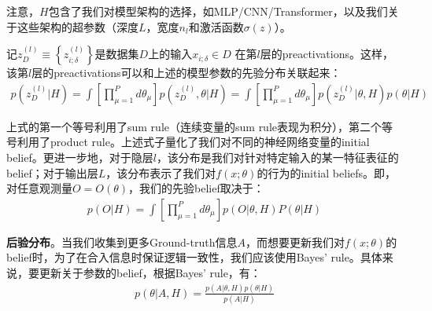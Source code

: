 注意，$H$包含了我们对模型架构的选择，如MLP/CNN/Transformer，以及我们关于这些架构的超参数（深度$L$，宽度$n_l$和激活函数$\sigma(z)$）。

记$z_{D}^{(l)}\equiv \left\{z_{i;\delta}^{(l)}\right\}$是数据集$D$上的输入$x_{i;\delta}\in D$ 在第$l$层的preactivations。这样，该第$l$层的preactivations可以和上述的模型参数的先验分布关联起来：
\begin{equation}
    \begin{split}
    p(z_{D}^{(l)}|H) 
    = \int \left[\prod_{\mu=1}^{P} d\theta_\mu\right] p \left(z_D^{(l)},\theta|H \right) 
    = \int \left[\prod_{\mu=1}^{P}d\theta_\mu\right] p \left(z_D^{(l)}|\theta,H\right) p(\theta|H)
    \end{split}
\end{equation}

上式的第一个等号利用了sum rule（连续变量的sum rule表现为积分），第二个等号利用了product rule。上述式子量化了我们对不同的神经网络变量的initial belief。更进一步地，对于隐层$l$，该分布是我们对针对特定输入的某一特征表征的belief；对于输出层$L$，该分布表示了我们对$f(x;\theta)$的行为的initial beliefs。即，对任意观测量$O=O(\theta)$，我们的先验belief取决于：
\begin{equation}
    \begin{split}
    p(O|H) = \int \left[\prod_{\mu=1}^{P}d\theta_\mu\right]
    p(O|\theta,H) P(\theta|H)
    \end{split}
\end{equation}


\textbf{后验分布}。当我们收集到更多Ground-truth信息$A$，而想要更新我们对$f(x;\theta)$的belief时，为了在合入信息时保证逻辑一致性，我们应该使用Bayes' rule。具体来说，要更新关于参数的belief，根据Bayes' rule，有：
\begin{equation}
    \begin{split}
        p(\theta|A,H) = \frac{p(A|\theta,H)p(\theta|H)}{p(A|H)}
    \end{split}
    \label{sec6:bayesian_inference}
\end{equation}

